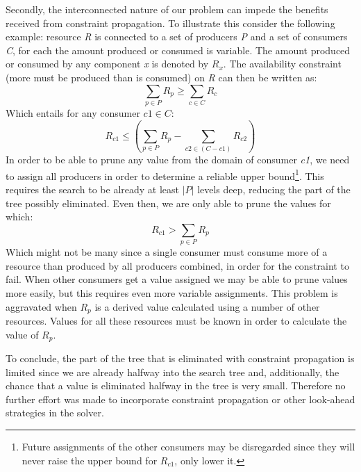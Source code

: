 Secondly, the interconnected nature of our problem can impede the benefits received from constraint propagation. To illustrate this consider the following example: resource \emph{R} is connected to a set of producers \emph{P} and a set of consumers \emph{C}, for each the amount produced or consumed is variable. The amount produced or consumed by any component \emph{x} is denoted by $R_x$. The availability constraint (more must be produced than is consumed) on \emph{R} can then be written as:
$$\sum_{p \in P}R_p \geq \sum_{c \in C}R_c$$
Which entails for any consumer $c1 \in C$: 
$$R_{c1} \leq \left(\sum_{p \in P} R_p - \sum_{c2 \in (C-c1)} R_{c2}\right)$$
In order to be able to prune any value from the domain of consumer \emph{c1}, we need to assign all producers in order to determine a reliable upper bound\footnote{Future assignments of the other consumers may be disregarded since they will never raise the upper bound for $R_{c1}$, only lower it.}. This requires the search to be already at least $|P|$ levels deep, reducing the part of the tree possibly eliminated. Even then, we are only able to prune the values for which:
$$R_{c1} > \sum_{p \in P} R_p$$
Which might not be many since a single consumer must consume more of a resource than produced by all producers combined, in order for the constraint to fail. When other consumers get a value assigned we may be able to prune values more easily, but this requires even more variable assignments. This problem is aggravated when $R_p$ is a derived value calculated using a number of other resources. Values for all these resources must be known in order to calculate the value of $R_p$.

To conclude, the part of the tree that is eliminated with constraint propagation is limited since we are already halfway into the search tree and, additionally, the chance that a value is eliminated halfway in the tree is very small. Therefore no further effort was made to incorporate constraint propagation or other look-ahead strategies in the solver.


	









